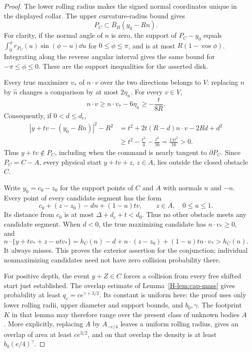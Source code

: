 \begin{proof}
The lower rolling radius makes the signed normal coordinates unique
in the displayed collar.  The upper curvature-radius bound gives
\[
             P_C\subset\overline B_R(y_0-Rn).
\]
For clarity, if the normal angle of $n$ is zero, the support of
$P_C-y_0$ equals
$\int_0^\phi r_{P_C}(u)\sin(\phi-u)\dd u$ for
$0\le\phi\le\pi$, and is at most $R(1-\cos\phi)$.
Integrating along the reverse angular interval gives the same bound
for $-\pi\le\phi\le0$.  These are the support inequalities for
the asserted disk.

Every true maximizer $v_*$ of $n\cdot v$ over the two directions
belongs to $V$: replacing $n$ by $\widehat n$ changes a comparison
by at most $2\eta_n$.  For every $v\in V$,
\[
             n\cdot v\ge n\cdot v_*-6\eta_n
                           \ge-\frac{t}{8R}.
\]
Consequently, if $0<d\le d_c$,
\begin{align*}
 |y+tv-(y_0-Rn)|^2-R^2
  &=t^2+2t(R-d)n\cdot v-2Rd+d^2\\
  &\ge t^2-\frac{t^2}{4}-\frac{t^2}{16}
      =\frac{11t^2}{16}>0.
\end{align*}
Thus $y+tv\notin P_C$, including when the command is nearly tangent
to $\partial P_C$.  Since $P_C=C-A$, every physical start
$y+tv+z$, $z\in A$, lies outside the closed obstacle $C$.

Write $y_0=c_0-z_0$ for the support points of $C$ and $A$ with
normals $n$ and $-n$.  Every point of every candidate segment has
the form
\[
          c_0+(z-z_0)-dn+(1-u)tv,
                   \qquad z\in A,\quad 0\le u\le1.
\]
Its distance from $c_0$ is at most $\Delta+d_c+t<d_0$.
Thus no other obstacle meets any candidate segment.  When $d<0$,
the true maximizing candidate has $n\cdot v_*\ge0$, and
\[
 n\cdot\{y+tv_*+z-utv_*\}
 =h_C(n)-d+n\cdot(z-z_0)+(1-u)t n\cdot v_*
 >h_C(n).
\]
It always misses.  This proves the exterior assertion for the
conjunction; individual nonmaximizing candidates need not have zero
collision probability there.

For positive depth, the event $y+Z\in C$ forces a collision from
every free shifted start just established.  The overlap estimate
of Lemma~\ref{H-lem:cap-mass} gives probability at least
$q_e=c e^{\gamma+3/2}$.  Its constant is uniform here: the proof
uses only lower rolling radii, upper diameter and support bounds,
and $b_0,\gamma$.  The footprint $K$ in that lemma may therefore
range over the present class of unknown bodies $A$.  More
explicitly, replacing $A$ by $A_{-e/4}$ leaves a uniform rolling
radius, gives an overlap of area at least $c e^{3/2}$, and on that
overlap the density is at least $b_0(e/4)^\gamma$.


\end{proof}
